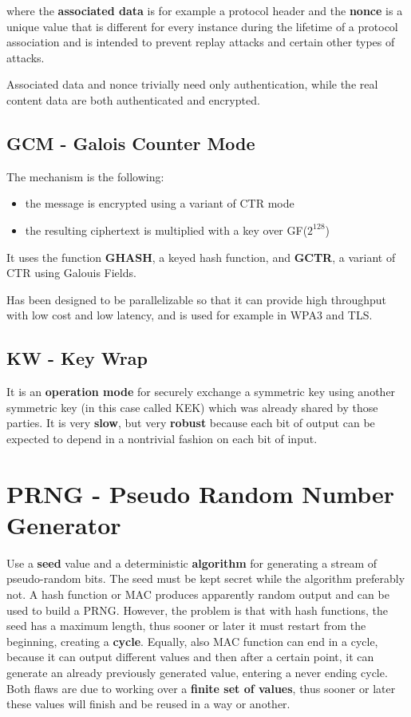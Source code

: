 \documentclass[oneside]{academica}
\begin{document}
where the \textbf{associated data} is for example a protocol header and the \textbf{nonce} is a unique value that is different for every instance during the lifetime of a protocol association and is intended to prevent replay attacks and certain other types of attacks.

Associated data and nonce trivially need only authentication, while the real content data are both authenticated and encrypted.

\subsection{GCM - Galois Counter Mode}

The mechanism is the following:
\begin{itemize}
  \item the message is encrypted using a variant of CTR mode
  \item the resulting ciphertext is multiplied with a key over GF($2^{128}$)
\end{itemize}

\newpage

It uses the function \textbf{GHASH}, a keyed hash function, and \textbf{GCTR}, a variant of CTR using Galouis Fields.

Has been designed to be parallelizable so that it can provide high throughput with low cost and low latency, and is used for example in WPA3 and TLS.

\subsection{KW - Key Wrap}

It is an \textbf{operation mode} for securely exchange a symmetric key using another symmetric key (in this case called KEK) which was already shared by those parties.
It is very \textbf{slow}, but very \textbf{robust} because each bit of output can be expected to depend in a nontrivial fashion on each bit of input.

\section{PRNG - Pseudo Random Number Generator}

Use a \textbf{seed} value and a deterministic \textbf{algorithm} for generating a stream of pseudo-random bits.
The seed must be kept secret while the algorithm preferably not.
A hash function or MAC produces apparently random output and can be used to build a PRNG.
However, the problem is that with hash functions, the seed has a maximum length, thus sooner or later it must restart from the beginning, creating a \textbf{cycle}.
Equally, also MAC function can end in a cycle, because it can output different values and then after a certain point, it can generate an already previously generated value, entering a never ending cycle.
Both flaws are due to working over a \textbf{finite set of values}, thus sooner or later these values will finish and be reused in a way or another.
\end{document}
